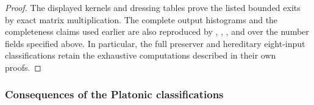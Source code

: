 \documentclass[11pt,letterpaper,onecolumn]{article}
\theoremstyle{plain}
\theoremstyle{definition}
\theoremstyle{remark}
\begin{document}
\begin{proof}
The displayed kernels and dressing tables prove the listed bounded
exits by exact matrix multiplication.  The complete output histograms
and the completeness claims used earlier are also reproduced by
,
,
, and
 over the number fields
specified above.  In particular, the full preserver and hereditary eight-input classifications retain
the exhaustive computations described in their own proofs.
\end{proof}

\subsubsection{Consequences of the Platonic classifications}
\end{document}
